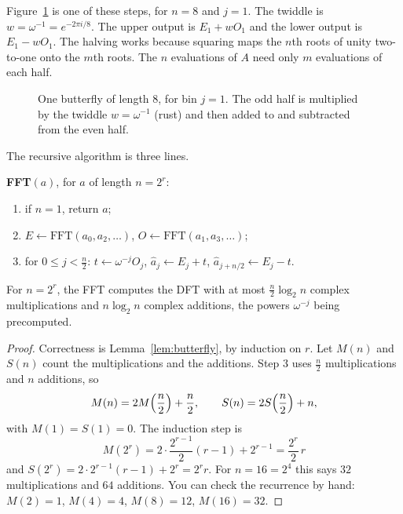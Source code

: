 Figure~\ref{fig:rw07-butterfly} is one of these steps, for $n=8$ and $j=1$. The twiddle is $w=\omega^{-1}=e^{-2\pi i/8}$. The upper output is $E_1+wO_1$ and the lower output is $E_1-wO_1$. The halving works because squaring maps the $n$th roots of unity two-to-one onto the $m$th roots. The $n$ evaluations of $A$ need only $m$ evaluations of each half.

\begin{figure}[ht]
\centering
{}
\caption{One butterfly of length $8$, for bin $j=1$. The odd half is multiplied by the twiddle $w=\omega^{-1}$ (rust) and then added to and subtracted from the even half.}
\label{fig:rw07-butterfly}
\end{figure}

The recursive algorithm is three lines.

\begin{center}
\begin{minipage}{0.9\linewidth}
\textbf{FFT}$(a)$, for $a$ of length $n=2^r$:
\begin{enumerate}
\item if $n=1$, return $a$;
\item $E\gets\mathrm{FFT}(a_0,a_2,\dots)$, $O\gets\mathrm{FFT}(a_1,a_3,\dots)$;
\item for $0\le j<\frac n2$: $t\gets\omega^{-j}O_j$, $\hat a_j\gets E_j+t$, $\hat a_{j+n/2}\gets E_j-t$.
\end{enumerate}
\end{minipage}
\end{center}

\begin{theorem}\label{thm:fft}
For $n=2^r$, the FFT computes the DFT with at most $\frac n2\log_2n$ complex multiplications and $n\log_2n$ complex additions,
the powers $\omega^{-j}$ being precomputed.
\end{theorem}
\begin{proof}
Correctness is Lemma~\ref{lem:butterfly}, by induction on $r$. Let $M(n)$ and $S(n)$ count the multiplications and the additions. Step 3 uses $\frac n2$ multiplications and $n$ additions, so
\[
M(n)=2M\Bigl(\frac n2\Bigr)+\frac n2,\qquad S(n)=2S\Bigl(\frac n2\Bigr)+n,
\]
with $M(1)=S(1)=0$. The induction step is
\[
M(2^r)=2\cdot\frac{2^{r-1}}2(r-1)+2^{r-1}=\frac{2^r}2\,r
\]
and $S(2^r)=2\cdot2^{r-1}(r-1)+2^r=2^r r$. For $n=16=2^4$ this says $32$ multiplications and $64$ additions. You can check the recurrence by hand: $M(2)=1$, $M(4)=4$, $M(8)=12$, $M(16)=32$.
\end{proof}

